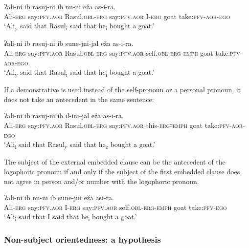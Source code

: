 ﻿\documentclass[output=paper]{langsci/langscibook}
\begin{document}
\ex \label{ex:10:39} %
\gll  ʡali-ni ib rasuj-ni ib nu-ni eža as-i-ra.\\
Ali-\textsc{erg} say:\textsc{pfv}.\textsc{aor} Rasul.\textsc{obl}-\textsc{erg}
say:\textsc{pfv}.\textsc{aor} I-\textsc{erg} goat take:\textsc{pfv}-\textsc{aor}-\textsc{ego}\\ 
\glt `Ali\textsubscript{y} said that Rasul\textsubscript{i} said that
he\textsubscript{i} bought a goat.'

\ex \label{ex:10:40} %
\gll  ʡali-ni ib rasuj-ni ib sune-jni-jal eža as-i-ra.\\
Ali-\textsc{erg} say:\textsc{pfv}.\textsc{aor} Rasul.\textsc{obl}-\textsc{erg} say:\textsc{pfv}.\textsc{aor} self.\textsc{obl}-\textsc{erg}-\textsc{emph} goat take:\textsc{pfv}-\textsc{aor}-\textsc{ego}\\ 
\glt `Ali\textsubscript{y} said that Rasul\textsubscript{i} said that
he\textsubscript{i} bought a goat.'
\z

If a demonstrative is used instead of the self-pronoun or a personal
pronoun, it does not take an antecedent in the same sentence:

\ea \label{ex:10:41} %
\gll  ʡali-ni ib rasuj-ni ib il-ini꞊jal eža as-i-ra.\\
Ali-\textsc{erg} say:\textsc{pfv}.\textsc{aor} Rasul.\textsc{obl}-\textsc{erg} say:\textsc{pfv}.\textsc{aor}  this-\textsc{erg}꞊\textsc{emph} goat take:\textsc{pfv}-\textsc{aor}-\textsc{ego}\\ 
\glt `Ali\textsubscript{i} said that Rasul\textsubscript{y} said that
he\textsubscript{z} bought a goat.'
\z

The subject of the external embedded clause can be the antecedent of the
logophoric pronoun if and only if the subject of the first embedded
clause does not agree in person and/or number with the logophoric
pronoun.

\ea %
\gll  ʡali-ni ib nu-ni ib sune-jni eža asi-ra.\\
Ali-\textsc{erg} say:\textsc{pfv}.\textsc{aor} I-\textsc{erg} say:\textsc{pfv}.\textsc{aor} self.\textsc{obl}-\textsc{erg}-\textsc{emph} goat take:\textsc{pfv}-\textsc{ego}\\ 
\glt `Ali\textsubscript{i} said that I said that he\textsubscript{i} bought a
goat.'
\z

\removelastskip
{}

\subsubsection{Non-subject orientedness: a hypothesis}\label{non-subject-orientedness}
\end{document}
